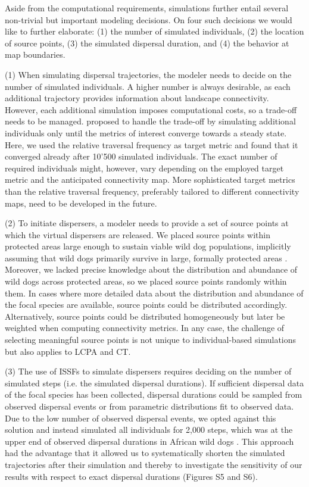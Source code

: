 \documentclass[abstract=on,10pt,a4paper,bibliography=totocnumbered]{article}
\begin{document}
Aside from the computational requirements, simulations further entail several
non-trivial but important modeling decisions. On four such decisions we would
like to further elaborate: (1) the number of simulated individuals, (2) the
location of source points, (3) the simulated dispersal duration, and (4)
the behavior at map boundaries.

(1) When simulating dispersal trajectories, the modeler needs to decide on the
number of simulated individuals. A higher number is always desirable, as each
additional trajectory provides information about landscape connectivity.
However, each additional simulation imposes computational costs, so a trade-off
needs to be managed. \cite{Signer.2017} proposed to handle the trade-off by
simulating additional individuals only until the metrics of interest converge
towards a steady state. Here, we used the relative traversal frequency as target
metric and found that it converged already after 10'500 simulated individuals.
The exact number of required individuals might, however, vary depending on the
employed target metric and the anticipated connectivity map. More sophisticated
target metrics than the relative traversal frequency, preferably tailored to
different connectivity maps, need to be developed in the future.

(2) To initiate dispersers, a modeler needs to provide a set of source points at
which the virtual dispersers are released. We placed source points within
protected areas large enough to sustain viable wild dog populations, implicitly
assuming that wild dogs primarily survive in large, formally protected areas
\citep{DaviesMostert.2012, Woodroffe.2012, VanDerMeer.2014}. Moreover, we lacked
precise knowledge about the distribution and abundance of wild dogs across
protected areas, so we placed source points randomly within them. In cases where
more detailed data about the distribution and abundance of the focal species are
available, source points could be distributed accordingly. Alternatively, source
points could be distributed homogeneously but later be weighted when computing
connectivity metrics. In any case, the challenge of selecting meaningful source
points is not unique to individual-based simulations but also applies to LCPA
and CT.

(3) The use of ISSFs to simulate dispersers requires deciding on the number of
simulated steps (i.e. the simulated dispersal durations). If sufficient
dispersal data of the focal species has been collected, dispersal durations
could be sampled from observed dispersal events or from parametric distributions
fit to observed data. Due to the low number of observed dispersal events, we
opted against this solution and instead simulated all individuals for 2,000
steps, which was at the upper end of observed dispersal durations in African
wild dogs \citep{DaviesMostert.2012, Masenga.2016, Cozzi.2020, Hofmann.2021}.
This approach had the advantage that it allowed us to systematically shorten the
simulated trajectories after their simulation and thereby to investigate the
sensitivity of our results with respect to exact dispersal durations (Figures S5
and S6).
\end{document}

